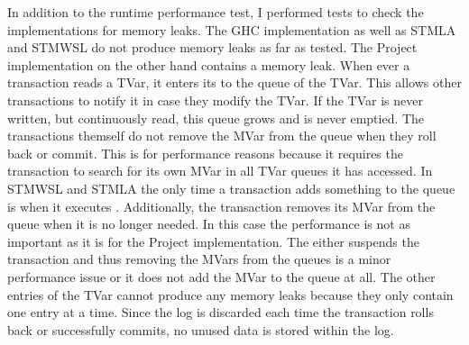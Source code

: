In addition to the runtime performance test, I performed tests to check the implementations for memory leaks. The GHC implementation
as well as STMLA and STMWSL do not produce memory leaks as far as tested. The Project implementation on the other hand 
contains a memory leak. When ever a transaction reads a TVar, it enters its  to the queue of the TVar.
This allows other transactions to notify it in case they modify the TVar. If the TVar is never written, but continuously read, this queue grows
and is never emptied. The transactions themself do not remove the MVar from the queue when they roll back or commit.
This is for performance reasons because it requires the transaction to search for its own MVar in all TVar queues it 
has accessed. In STMWSL and STMLA the only time a transaction adds something to the queue is when it executes 
. Additionally, the transaction removes its MVar from the queue when it is no longer needed. In this 
case the performance is not as important as it is for the Project implementation. The  either suspends 
the transaction and thus removing the MVars from the queues is a minor performance issue or it does not add the MVar to
the queue at all. The other entries of the TVar cannot produce any memory leaks because they only contain one entry
at a time. Since the log is discarded each time the transaction rolls back or successfully commits, no unused data is stored
within the log.